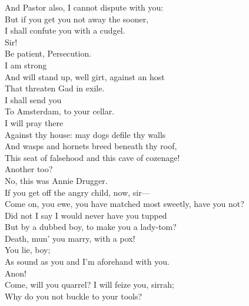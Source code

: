 \documentclass[a4paper,oneside,12pt]{memoir}
\begin{document}
\begin{drama*}
And Pastor also, I cannot dispute with you:\\
But if you get you not away the sooner,\\
I shall confute you with a cudgel.\\
\persecutionspeaks {} Sir!\\
\tribulationspeaks Be patient, Persecution.\\
\persecutionspeaks {} I am strong\\
And will stand up, well girt, against an host\\
That threaten Gad in exile.\\
\lovewitspeaks {} I shall send you\\
To Amsterdam, to your cellar.\\
\persecutionspeaks {} I will pray there\\
Against thy house: may dogs defile thy walls\\
And wasps and hornets breed beneath thy roof,\\
This seat of falsehood and this cave of cozenage!\\
\lovewitspeaks Another too?\\
\facespeaks {} No, this was Annie Drugger.\\
If you get off the angry child, now, sir---\\
\kastrilspeaks Come on, you ewe, you have matched most sweetly, have you not?\\
Did not I say I would never have you tupped\\
But by a dubbed boy, to make you a lady-tom?\\
Death, mun' you marry, with a pox!\\
\lovewitspeaks {} You lie, boy;\\
As sound as you and I'm aforehand with you.\\
\kastrilspeaks Anon!\\
\lovewitspeaks {} Come, will you quarrel? I will feize you, sirrah;\\
Why do you not buckle to your tools?\\

\end{drama*}
\end{document}
